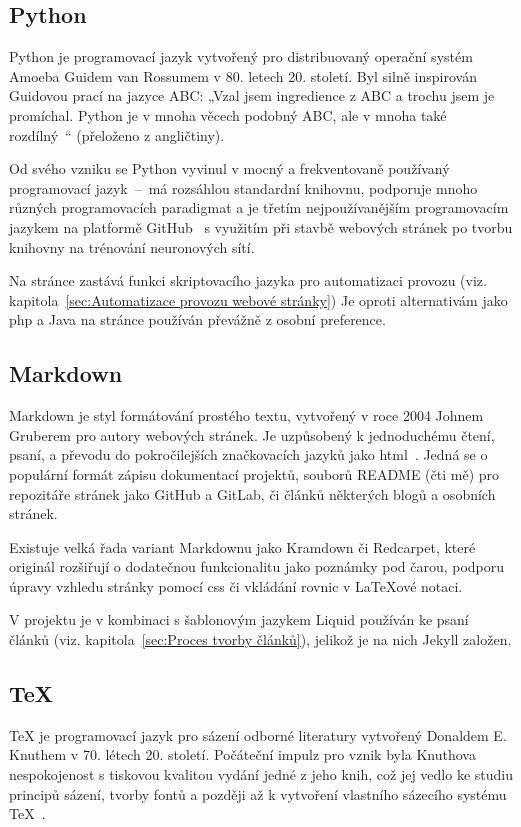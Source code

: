\documentclass[a4paper, 12pt]{article}
\newcommand*{\fullref}[1]{\hyperref[{#1}]{\ref*{#1}}}
\begin{document}
  \subsection{Python} \label{sec:Python}
  Python je programovací jazyk vytvořený pro distribuovaný operační systém Amoeba Guidem van Rossumem v 80. letech 20. století. Byl silně inspirován Guidovou prací na jazyce ABC: „Vzal jsem ingredience z ABC a trochu jsem je promíchal. Python je v mnoha věcech podobný ABC, ale v mnoha také rozdílný~\cite{making-of-python}“ (přeloženo z angličtiny).

  Od svého vzniku se Python vyvinul v mocný a frekventovaně používaný programovací jazyk~--~má rozsáhlou standardní knihovnu, podporuje mnoho různých programovacích paradigmat a je třetím nejpoužívanějším programovacím jazykem na platformě GitHub~\cite{github-statistics} s využitím při stavbě webových stránek po tvorbu knihovny na trénování neuronových sítí.

  Na stránce zastává funkci skriptovacího jazyka pro automatizaci provozu (viz. kapitola~\fullref{sec:Automatizace provozu webové stránky}) Je oproti alternativám jako \gls{php} a Java na stránce používán převážně z osobní preference.


  \subsection{Markdown} \label{sec:Markdown}
  Markdown je styl formátování prostého textu, vytvořený v roce 2004 Johnem Gruberem pro autory webových stránek. Je uzpůsobený k jednoduchému čtení, psaní, a převodu do pokročilejších značkovacích jazyků jako \gls{html}~\cite{markdown-history}. Jedná se o populární formát zápisu dokumentací projektů, souborů README (čti mě) pro repozitáře stránek jako GitHub a GitLab, či článků některých blogů a osobních stránek.

  Existuje velká řada variant Markdownu jako Kramdown či Redcarpet, které originál rozšiřují o dodatečnou funkcionalitu jako poznámky pod čarou, podporu úpravy vzhledu stránky pomocí \gls{css} či vkládání rovnic v \LaTeX ové notaci.

  V projektu je v kombinaci s šablonovým jazykem Liquid používán ke psaní článků (viz. kapitola~\fullref{sec:Proces tvorby článků}), jelikož je na nich Jekyll založen.


  \subsection{\TeX} \label{sec:TeX}
  \TeX{} je programovací jazyk pro sázení odborné literatury vytvořený Donaldem E. Knuthem v 70. létech 20. století. Počáteční impulz pro vznik byla Knuthova nespokojenost s tiskovou kvalitou vydání jedné z jeho knih, což jej vedlo ke studiu principů sázení, tvorby fontů a později až k vytvoření vlastního sázecího systému \TeX{}~\cite{tex-history}.
\end{document}
